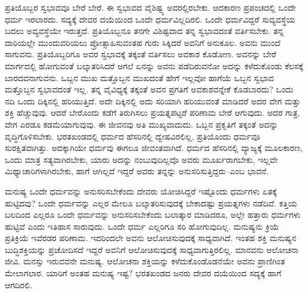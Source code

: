 \vskip 0.2cm

ಪ್ರತಿಯೊಬ್ಬರ ಸ್ವಭಾವವೂ ಬೇರೆ ಬೇರೆ. ಈ ಸ್ವಭಾವದ ವೈಶಿಷ್ಟ್ಯ ಅವರಲ್ಲಿರಬೇಕು. ಆದಕಾರಣ ಪ್ರಪಂಚದಲ್ಲಿ ಒಂದೇ ಧರ್ಮ ಇರಲಾರದು. ಸದ್ಯಕ್ಕೆ ದೇವರ ದಯೆಯಿಂದ ಒಂದೇ ಧರ್ಮವಿಲ್ಲದಿರಲಿ. ಒಂದೇ ಧರ್ಮವಿದ್ದರೆ ಸುವ್ಯವಸ್ಥೆಯ ಬದಲು ಅವ್ಯವಸ್ಥೆಯೇ ಇರುತ್ತದೆ. ಪ್ರತಿಯೊಬ್ಬನೂ ತನಗೇ ವಿಶಿಷ್ಟವಾದ ತನ್ನ ಸ್ವಭಾವದಂತೆ ವರ್ತಿಸಬೇಕು. ತನ್ನ ದಾರಿಯಲ್ಲೇ ಮುಂದುವರಿಯಲು ಪ್ರೋತ್ಸಾಹಿಸುವಂತಹ ಗುರು ಸಿಕ್ಕಿದರೆ ಅವನಿಗೆ ಅನುಕೂಲ. ಅವನು ಮುಂದೆ ಸಾಗುವನು. ಪ್ರತಿಯೊಬ್ಬರಿಗೂ ಅವರ ಸ್ವಭಾವಕ್ಕೆ ತಕ್ಕಂತೆ ವರ್ತಿಸಲು ಅವಕಾಶ ಕೊಡೋಣ. ಅವನನ್ನು ಬೇರೆ ಮಾರ್ಗದಲ್ಲಿ ಹೋಗುವಂತೆ ಬಲ್ಕಾತರಿಸಿದರೆ ಆಗಲೆ ಏನನ್ನು ಅವನು ಪಡೆದಿರುವನೋ ಅದನ್ನು ಕಳೆದುಕೊಂಡು ಕೆಲಸಕ್ಕೆ ಬಾರದವನಾಗುವನು. ಒಬ್ಬನ ಮುಖ ಮತ್ತೊಬ್ಬನ ಮುಖದಂತೆ ಹೇಗೆ ಇಲ್ಲವೋ ಹಾಗೆಯೆ ಒಬ್ಬನ ಸ್ವಭಾವ ಮತ್ತೊಬ್ಬನ ಸ್ವಭಾವದಂತೆ ಇಲ್ಲ. ತನ್ನ ವೈವಿಧ್ಯಕ್ಕೆ ತಕ್ಕಂತೆ ಅವನ ಪ್ರಗತಿಗೆ ಅವಕಾಶವನ್ನೇಕೆ ಕೊಡಬಾರದು? ಒಂದು ನದಿ ಒಂದು ದಿಕ್ಕಿನಲ್ಲಿ ಹರಿಯುತ್ತಿದೆ. ಅದೇ ದಿಕ್ಕಿನಲ್ಲಿ ಅದು ಸರಿಯಾಗಿ ಹರಿಯುವಂತೆ ಮಾಡಿದರೆ ಅದರ ವೇಗ ಮತ್ತು ಶಕ್ತಿ ಹೆಚ್ಚುವುವು. ಆದರೆ ಬೇರೊಂದು ಕಡೆಗೆ ತಿರುಗಿಸಲು ಪ್ರಯತ್ನಪಟ್ಟರೆ ಪರಿಣಾಮ ಬೇರೆ ಆಗುವುದು. ಅದರ ಗಾತ್ರ, ವೇಗ ಎರಡೂ ಕಡಮೆಯಾಗುವುವು. ಈ ಜೀವನವು ಅತಿ ಮುಖ್ಯವಾದುದು. ಒಬ್ಬನ ಪ್ರಕೃತಿಗೆ ತಕ್ಕಂತೆ ಅದನ್ನು ವೃದ್ಧಿಗೊಳಿಸಬೇಕು. ಭರತಖಂಡದಲ್ಲಿ ಧರ್ಮದ ಹೆಸರಿನಲ್ಲಿ ದ್ವೇಷವಿರಲಿಲ್ಲ, ಪ್ರತಿಯೊಂದು ಧರ್ಮವೂ ಸುರಕ್ಷಿತವಾಗಿತ್ತು. ಅದಕ್ಕಾಗಿಯೇ ಧರ್ಮವು ಈಗಲೂ ಜೀವಂತವಾಗಿದೆ. ಧರ್ಮದ ಹೆಸರಿನಲ್ಲಿ ವ್ಯಾಜ್ಯಕ್ಕೆ ಮೂಲಕಾರಣ, ಒಂದು ಮಾತ್ರ ಸತ್ಯವಾಗಿರಬೇಕು, ಯಾರು ಅದನ್ನು ನಂಬುವುದಿಲ್ಲವೊ ಅವರು ಮೂರ್ಖರಾಗಬೇಕು, ಇಲ್ಲವೇ ಮಿಥ್ಯಾಚಾರಿಗಳಾಗಿರಬೇಕು, ಹಾಗೆ ಆಗಿಲ್ಲದೆ ಇದ್ದರೆ ಅವರು ತನ್ನನ್ನು ಅನುಸರಿಸುತ್ತಿದ್ದರು–ಎಂಬ ಭಾವನೆ.

\vskip 0.2cm

ಮನುಷ್ಯ ಒಂದೇ ಧರ್ಮವನ್ನು ಅನುಸರಿಸಬೇಕೆಂದು ದೇವರು ಯೋಚಿಸಿದ್ದರೆ ಇಷ್ಟೊಂದು ಧರ್ಮಗಳು ಏತಕ್ಕೆ ಹುಟ್ಟಿದವು? ಒಂದೇ ಧರ್ಮವನ್ನು ಎಲ್ಲರ ಮೇಲೂ ಬಲ್ಕಾತರಿಸುವುದಕ್ಕೆ ಬೇಕಾದಷ್ಟು ಪ್ರಯತ್ನಗಳು ನಡೆದಿವೆ. ಕತ್ತಿಯ ಬಲದಿಂದ ಎಲ್ಲರೂ ಒಂದೇ ಧರ್ಮವನ್ನು ಅನುಸರಿಸಬೇಕೆಂದು ಬಲಾತ್ಕಾರ ಮಾಡಿದರೂ, ಅಲ್ಲೇ ಹತ್ತಾರು ಧರ್ಮಗಳು ಹುಟ್ಟಿವೆ ಎಂದು ಇತಿಹಾಸ ಸಾರುವುದು. ಒಂದೇ ಧರ್ಮ ಎಲ್ಲರಿಗೂ ಸರಿ ಹೋಗುವುದಿಲ್ಲ. ಮನುಷ್ಯನು ಕ್ರಿಯೆ ಪ್ರತಿಕ್ರಿಯೆ ಇವೆರಡರ ಪರಿಣಾಮ. ಇದರಿಂದಲೇ ಅವನು ಆಲೋಚಿಸುವುದಕ್ಕೆ ಸಾಧ್ಯವಾಗಿದೆ. ಇಂತಹ ಶಕ್ತಿ ಮನುಷ್ಯನ ಬುದ್ಧಿಶಕ್ತಿಯನ್ನು ಪ್ರಚೋದಿಸದೆ ಇದ್ದರೆ ಅವನಿಗೆ ಆಲೋಚಿಸುವುದಕ್ಕೆ ಸಾಧ್ಯವಾಗುತ್ತಿರಲಿಲ್ಲ. ಮಾನವನು ಆಲೋಚನಾ ಜೀವಿ. ಮನಸ್ಸು ಇರುವವನೇ ಮನುಷ್ಯ. ಆಲೋಚನಾ ಶಕ್ತಿಯನ್ನು ಕಳೆದುಕೊಂಡೊಡನೆಯೇ ಅವನು ಪ್ರಾಣಿಗಿಂತ ಮೇಲಾಗಲಾರ. ಯಾರಿಗೆ ಅಂತಹ ಮನುಷ್ಯ ಇಷ್ಟ? ಭರತಖಂಡದ ಜನರು ದೇವರ ದಯೆಯಿಂದ ಸದ್ಯಕ್ಕೆ ಹಾಗೆ ಆಗದಿರಲಿ.

\vskip 0.2cm

